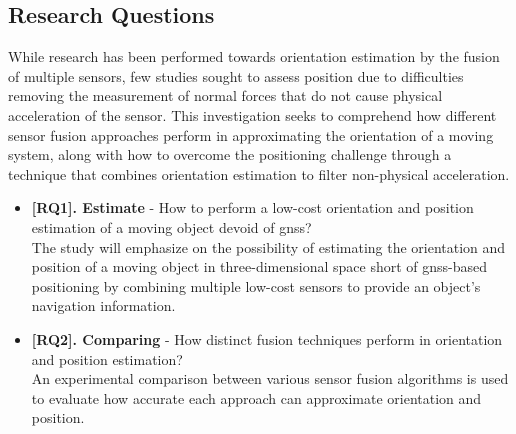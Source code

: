 

\subsection{Research Questions}
While research has been performed towards orientation estimation by the fusion of multiple sensors, few studies sought to assess position due to difficulties removing the measurement of normal forces that do not cause physical acceleration of the sensor. This investigation seeks to comprehend how different sensor fusion approaches perform in approximating the orientation of a moving system, along with how to overcome the positioning challenge through a technique that combines orientation estimation to filter non-physical acceleration.

\begin{itemize}
    \item \textbf{[RQ1]. Estimate} - How to perform a low-cost orientation and position estimation of a moving object devoid of \acrshort{gnss}?\\
          The study will emphasize on the possibility of estimating the orientation and position of a moving object in three-dimensional space short of \acrshort{gnss}-based positioning by combining multiple low-cost sensors to provide an object's navigation information.
    \item \textbf{[RQ2]. Comparing} - How distinct fusion techniques perform in orientation and position estimation? \\
          An experimental comparison between various sensor fusion algorithms is used to evaluate how accurate each approach can approximate orientation and position.

\end{itemize}